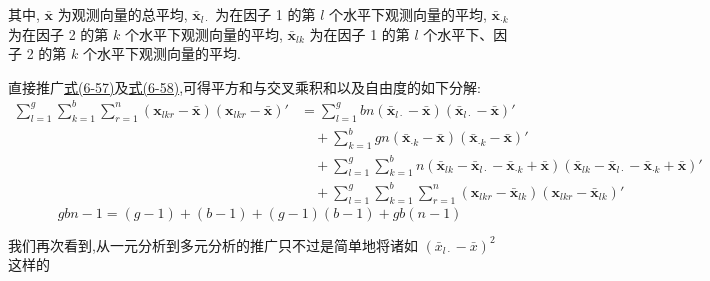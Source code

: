其中, $\bar{\mathbf{x}}$ 为观测向量的总平均, $\bar{\mathbf{x}}_{l\cdot}$ 为在因子 1 的第 $l$ 个水平下观测向量的平均, $\bar{\mathbf{x}}_{\cdot k}$ 为在因子 2 的第 $k$ 个水平下观测向量的平均, $\bar{\mathbf{x}}_{lk}$ 为在因子 1 的第 $l$ 个水平下、因子 2 的第 $k$ 个水平下观测向量的平均.

直接推广\hyperref[eq:6-57]{式(6-57)}及\hyperref[eq:6-58]{式(6-58)},可得平方和与交叉乘积和以及自由度的如下分解:
\label{eq:6-61}
\begin{equation}
\begin{aligned}
\sum_{l=1}^{g}\sum_{k=1}^{b}\sum_{r=1}^{n}(\mathbf{x}_{lkr}-\bar{\mathbf{x}})(\mathbf{x}_{lkr}-\bar{\mathbf{x}})'
&= \sum_{l=1}^{g} bn(\bar{\mathbf{x}}_{l\cdot}-\bar{\mathbf{x}})(\bar{\mathbf{x}}_{l\cdot}-\bar{\mathbf{x}})' \\
&\quad + \sum_{k=1}^{b} gn(\bar{\mathbf{x}}_{\cdot k}-\bar{\mathbf{x}})(\bar{\mathbf{x}}_{\cdot k}-\bar{\mathbf{x}})' \\
&\quad + \sum_{l=1}^{g}\sum_{k=1}^{b} n(\bar{\mathbf{x}}_{lk}-\bar{\mathbf{x}}_{l\cdot}-\bar{\mathbf{x}}_{\cdot k}+\bar{\mathbf{x}})(\bar{\mathbf{x}}_{lk}-\bar{\mathbf{x}}_{l\cdot}-\bar{\mathbf{x}}_{\cdot k}+\bar{\mathbf{x}})' \\
&\quad + \sum_{l=1}^{g}\sum_{k=1}^{b}\sum_{r=1}^{n}(\mathbf{x}_{lkr}-\bar{\mathbf{x}}_{lk})(\mathbf{x}_{lkr}-\bar{\mathbf{x}}_{lk})'
\end{aligned}
\tag{6-61}
\end{equation}
\label{eq:6-62}
\begin{equation}
gbn-1 = (g-1)+(b-1)+(g-1)(b-1)+gb(n-1) \tag{6-62}
\end{equation}

我们再次看到,从一元分析到多元分析的推广只不过是简单地将诸如 $(\bar{x}_{l\cdot}-\bar{x})^2$ 这样的
